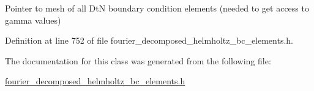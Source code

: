 Pointer to mesh of all DtN boundary condition elements (needed to get access to gamma values) 



Definition at line 752 of file fourier\+\_\+decomposed\+\_\+helmholtz\+\_\+bc\+\_\+elements.\+h.



The documentation for this class was generated from the following file\+:\begin{DoxyCompactItemize}
\item 
\hyperlink{fourier__decomposed__helmholtz__bc__elements_8h}{fourier\+\_\+decomposed\+\_\+helmholtz\+\_\+bc\+\_\+elements.\+h}\end{DoxyCompactItemize}
